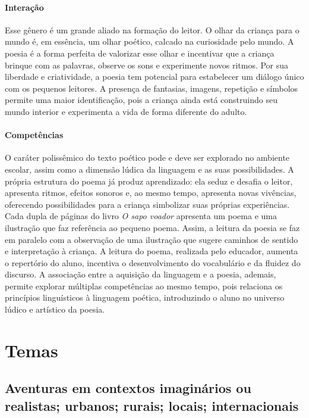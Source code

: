 \documentclass[11pt]{extarticle}
\begin{document}
\paragraph{Interação} Esse gênero é um grande aliado na formação do leitor. O olhar da criança para o mundo é, em essência, um olhar poético, calcado na curiosidade pelo mundo. A poesia é a forma perfeita de valorizar esse olhar e incentivar que a criança brinque com as palavras, observe os sons e experimente novos ritmos. Por sua liberdade e criatividade, a poesia tem potencial para estabelecer um diálogo único com os pequenos leitores. A presença de fantasias, imagens, repetição e símbolos permite uma maior identificação, pois a criança ainda está construindo seu mundo interior e experimenta a vida de forma diferente do adulto. 

\paragraph{Competências} 
O caráter polissêmico do texto poético pode e deve ser explorado no ambiente escolar, assim como a dimensão lúdica da linguagem e as suas possibilidades. A própria estrutura do poema já produz aprendizado: ela seduz e desafia o leitor, apresenta ritmos, efeitos sonoros e, ao mesmo tempo, apresenta novas vivências, oferecendo possibilidades para a criança simbolizar suas próprias experiências. Cada dupla de páginas do livro \textit{O sapo voador} apresenta um poema e uma ilustração que faz referência ao pequeno poema. Assim, a leitura da poesia se faz em paralelo com a observação de uma ilustração que sugere caminhos de sentido e interpretação à criança. A leitura do poema, realizada pelo educador, aumenta o repertório do aluno, incentiva o desenvolvimento do vocabulário e da fluidez do discurso.
A associação entre a aquisição da linguagem e a poesia, ademais, permite explorar múltiplas competências ao mesmo tempo, pois relaciona os princípios linguísticos à linguagem poética, introduzindo o aluno no universo lúdico e artístico da poesia.



\section{Temas}

\subsection{Aventuras em contextos imaginários ou realistas; urbanos; rurais; locais; internacionais}
\end{document}
